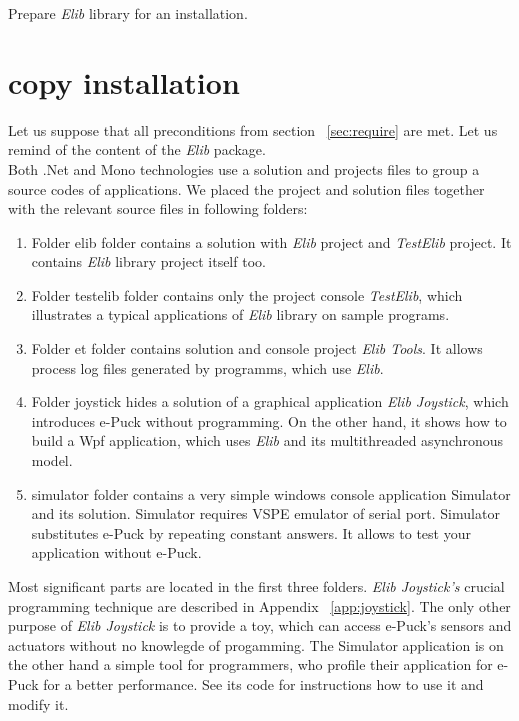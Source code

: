 \documentclass[12pt,notitlepage]{report}
\begin{document}
	Prepare {\it Elib} library for an installation.
	
	\section{copy installation} \label{sec:copy}
	Let us suppose that all preconditions from section ~\ref{sec:require} are met.
	Let us remind of the content of the {\it Elib} package.\\

	Both .Net and Mono technologies use a solution and projects files to group a source codes of applications.
	We placed the project and solution files together with the relevant source files in following folders:

	\begin{enumerate}
		\item Folder { \sf elib} folder contains a solution with {\it Elib} project and {\it TestElib} project.
			It contains {\it Elib} library project itself too.
		\item Folder { \sf testelib} folder contains only the project console {\it TestElib}, 
		which illustrates a typical applications of {\it Elib} library on sample programs.
		\item Folder { \sf et} folder contains solution and console project {\it Elib Tools}. 
		It allows process log files generated by programms,
		which use {\it Elib}.
		\item Folder { \sf joystick} hides a solution of a graphical application {\it Elib Joystick},
		which introduces e-Puck without programming. On the other hand, it shows
		how to build a Wpf application, which uses {\it Elib} and its multithreaded asynchronous model.
		\item { \sf simulator} folder contains a very simple windows console application Simulator and its solution. 
		Simulator requires VSPE emulator of serial port. Simulator
		 substitutes e-Puck by repeating constant answers. It allows to test your application without e-Puck.
	\end{enumerate}

	Most significant parts are located in the first three folders.
	{\it Elib Joystick's} crucial programming technique are described in Appendix ~\ref{app:joystick}.
	The only other purpose of {\it Elib Joystick} is to provide a toy, which can access e-Puck's sensors and actuators without no knowlegde of progamming.
	The Simulator application is on the other hand a simple tool for programmers, who profile their application for e-Puck for a better performance.
	See its code for instructions how to use it and modify it.
\end{document}
